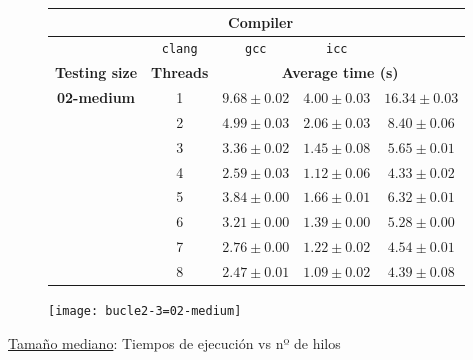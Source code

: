 \begin{figure}[H]
    \centering
    \begin{subfigure}{0.4\textwidth}
        \begin{adjustbox}{width=\textwidth} 
        \begin{tabular}{|c|c|c|c|c|}
            \hline
            \rowcolor{azul} \multicolumn{2}{|c|}{}&\multicolumn{3}{c|}{\textbf{Compiler}} \\ \hline
            \rowcolor{azul} \multicolumn{2}{|c|}{}&\texttt{clang}&\texttt{gcc}&\texttt{icc}\\ \hline
            \rowcolor{azul} \textbf{Testing size} & \textbf{Threads}&\multicolumn{3}{c|}{\textbf{Average time (s)}} \\ \hline
            \multirow{8}{2.5cm}{\textbf{02-medium}} & 1 & \(9.68\pm{0.02}\) & \(4.00\pm{0.03}\) & \(16.34\pm{0.03}\) \\ \cline{2-5}
            & 2 & \(4.99\pm{0.03}\) & \(2.06\pm{0.03}\) & \(8.40\pm{0.06}\) \\ \cline{2-5}
            & 3 & \(3.36\pm{0.02}\) & \(1.45\pm{0.08}\) & \(5.65\pm{0.01}\) \\ \cline{2-5}
            & 4 & \(2.59\pm{0.03}\) & \(1.12\pm{0.06}\) & \(4.33\pm{0.02}\) \\ \cline{2-5}
            & 5 & \(3.84\pm{0.00}\) & \(1.66\pm{0.01}\) & \(6.32\pm{0.01}\) \\ \cline{2-5}
            & 6 & \(3.21\pm{0.00}\) & \(1.39\pm{0.00}\) & \(5.28\pm{0.00}\) \\ \cline{2-5}
            & 7 & \(2.76\pm{0.00}\) & \(1.22\pm{0.02}\) & \(4.54\pm{0.01}\) \\ \cline{2-5}
            & 8 & \(2.47\pm{0.01}\) & \(1.09\pm{0.02}\) & \(4.39\pm{0.08}\) \\ \hline
        \end{tabular}
        \end{adjustbox}
    \end{subfigure}
    \hfill
    \begin{subfigure}{0.5\textwidth}
        \texttt{[image: bucle2-3=02-medium]}
    \end{subfigure}
    \caption{\underline{Tamaño mediano}: Tiempos de ejecución vs nº de hilos}
    \label{bucle2-3=02-medium}
\end{figure}

